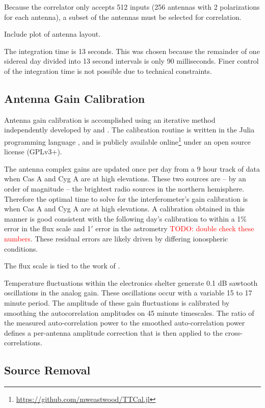 \documentclass[twocolumn]{aastex6}
\newcommand{\todo}[1]{\textcolor{red}{TODO: #1}\PackageWarning{TODO:}{#1!}}
\begin{document}
Because the correlator only accepts 512 inputs (256 antennas with 2 polarizations for each antenna),
a subset of the antennas must be selected for correlation.

Include plot of antenna layout.

The integration time is 13 seconds. This was chosen because the remainder of one sidereal day
divided into 13 second intervals is only 90 milliseconds.  Finer control of the integration time is
not possible due to technical constraints.

\subsection{Antenna Gain Calibration}

Antenna gain calibration is accomplished using an iterative method independently developed by
\citet{2008ISTSP...2..707M} and \citet{2014A&A...571A..97S}. The calibration routine is written in
the Julia programming language \citep{BEKS14}, and is publicly available
online\footnote{\url{https://github.com/mweastwood/TTCal.jl}} under an open source license (GPLv3+).

The antenna complex gains are updated once per day from a 9 hour track of data when Cas A and Cyg A
are at high elevations.  These two sources are -- by an order of magnitude -- the brightest radio
sources in the northern hemisphere.  Therefore the optimal time to solve for the interferometer's
gain calibration is when Cas A and Cyg A are at high elevations. A calibration obtained in this
manner is good consistent with the following day's calibration to within a 1\% error in the flux
scale and 1$'$ error in the astrometry \todo{double check these numbers}. These residual errors are
likely driven by differing ionospheric conditions.

The flux scale is tied to the work of \citet{2016arXiv160905940P}.

Temperature fluctuations within the electronics shelter generate 0.1 dB sawtooth oscillations in the
analog gain. These oscillations occur with a variable 15 to 17 minute period. The amplitude of these
gain fluctuations is calibrated by smoothing the autocorrelation amplitudes on 45 minute timescales.
The ratio of the measured auto-correlation power to the smoothed auto-correlation power defines a
per-antenna amplitude correction that is then applied to the cross-correlations.

\subsection{Source Removal}
\end{document}
